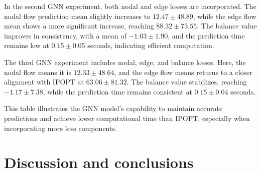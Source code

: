 In the second GNN experiment, both nodal and edge losses are incorporated. The nodal flow prediction mean slightly increases to \( 12.47 \pm 48.89 \), while the edge flow mean shows a more significant increase, reaching \( 88.32 \pm 73.55 \). The balance value improves in consistency, with a mean of \( -1.03 \pm 1.90 \), and the prediction time remains low at \( 0.15 \pm 0.05 \) seconds, indicating efficient computation.

The third GNN experiment includes nodal, edge, and balance losses. Here, the nodal flow means it is \( 12.33 \pm 48.64 \), and the edge flow means returns to a closer alignment with IPOPT at \( 63.06 \pm 81.32 \). The balance value stabilizes, reaching \( -1.17 \pm 7.38 \), while the prediction time remains consistent at \( 0.15 \pm 0.04 \) seconds.

This table illustrates the GNN model's capability to maintain accurate predictions and achieve lower computational time than IPOPT, especially when incorporating more loss components.



\section{Discussion and conclusions}


